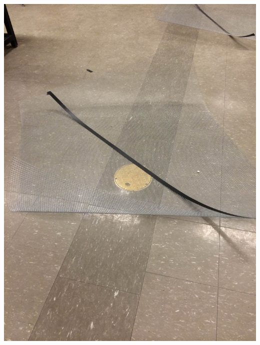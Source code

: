\documentclass[11pt]{article} %
\begin{document}
\begin{center}
\includegraphics[scale=0.12]{dish/10.jpeg}
\end{center}
\end{document}
